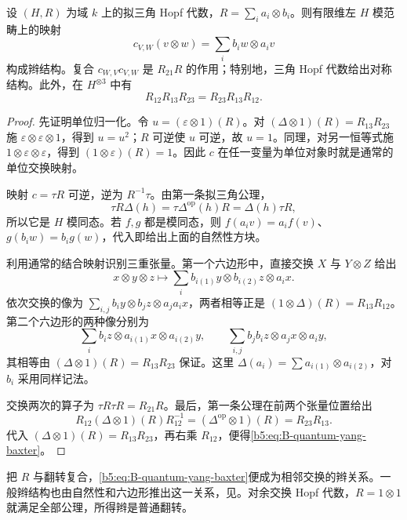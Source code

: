 \begin{proposition}\label{b5:prop:B-r-braiding}
	设 \((H,R)\) 为域 \(k\) 上的拟三角 Hopf 代数，\(R=\sum_i a_i\otimes b_i\)。则有限维左 \(H\) 模范畴上的映射
	\[
		c_{V,W}(v\otimes w)=\sum_i b_iw\otimes a_iv
	\]
	构成辫结构。复合 \(c_{W,V}c_{V,W}\) 是 \(R_{21}R\) 的作用；特别地，三角 Hopf 代数给出对称结构。此外，在 \(H^{\otimes3}\) 中有
	\begin{equation}\label{b5:eq:B-quantum-yang-baxter}
		R_{12}R_{13}R_{23}=R_{23}R_{13}R_{12}.
	\end{equation}
\end{proposition}
\begin{proof}
	先证明单位归一化。令 \(u=(\varepsilon\otimes1)(R)\)。对 \((\Delta\otimes1)(R)=R_{13}R_{23}\) 施 \(\varepsilon\otimes\varepsilon\otimes1\)，得到 \(u=u^2\)；\(R\) 可逆使 \(u\) 可逆，故 \(u=1\)。同理，对另一恒等式施 \(1\otimes\varepsilon\otimes\varepsilon\)，得到 \((1\otimes\varepsilon)(R)=1\)。因此 \(c\) 在任一变量为单位对象时就是通常的单位交换映射。

	映射 \(c=\tau R\) 可逆，逆为 \(R^{-1}\tau\)。由第一条拟三角公理，
	\[
		\tau R\Delta(h)=\tau\Delta^{\mathrm{op}}(h)R=\Delta(h)\tau R,
	\]
	所以它是 \(H\) 模同态。若 \(f,g\) 都是模同态，则 \(f(a_iv)=a_if(v)\)、\(g(b_iw)=b_ig(w)\)，代入即给出上面的自然性方块。

	利用通常的结合映射识别三重张量。第一个六边形中，直接交换 \(X\) 与 \(Y\otimes Z\) 给出
	\[
		x\otimes y\otimes z\longmapsto
		\sum_i b_{i(1)}y\otimes b_{i(2)}z\otimes a_ix.
	\]
	依次交换的像为 \(\sum_{i,j}b_i y\otimes b_jz\otimes a_ja_ix\)，两者相等正是 \((1\otimes\Delta)(R)=R_{13}R_{12}\)。第二个六边形的两种像分别为
	\[
		\sum_i b_i z\otimes a_{i(1)}x\otimes a_{i(2)}y,
		\qquad
		\sum_{i,j}b_jb_i z\otimes a_jx\otimes a_i y,
	\]
	其相等由 \((\Delta\otimes1)(R)=R_{13}R_{23}\) 保证。这里 \(\Delta(a_i)=\sum a_{i(1)}\otimes a_{i(2)}\)，对 \(b_i\) 采用同样记法。

	交换两次的算子为 \(\tau R\tau R=R_{21}R\)。最后，第一条公理在前两个张量位置给出
	\[
		R_{12}(\Delta\otimes1)(R)R_{12}^{-1}
		=(\Delta^{\mathrm{op}}\otimes1)(R)=R_{23}R_{13}.
	\]
	代入 \((\Delta\otimes1)(R)=R_{13}R_{23}\)，再右乘 \(R_{12}\)，便得\eqref{b5:eq:B-quantum-yang-baxter}。
\end{proof}

把 \(R\) 与翻转复合，\eqref{b5:eq:B-quantum-yang-baxter}便成为相邻交换的辫关系。一般辫结构也由自然性和六边形推出这一关系，见\cite[Proposition 8.1.10, pp. 195--196]{EtingofEtAl2015TensorCategories}。对余交换 Hopf 代数，\(R=1\otimes1\) 就满足全部公理，所得辫是普通翻转。


